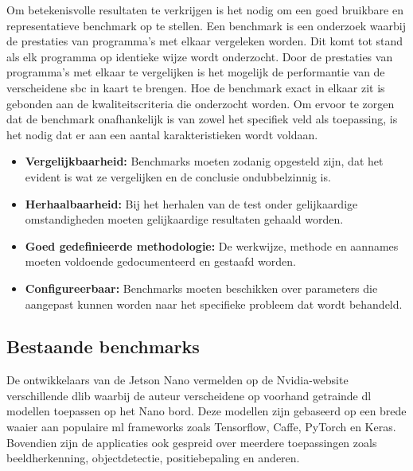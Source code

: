 Om betekenisvolle resultaten te verkrijgen is het nodig om een goed bruikbare en representatieve benchmark op te stellen. Een benchmark is een onderzoek waarbij de prestaties van programma's met elkaar vergeleken worden. Dit komt tot stand als elk programma op identieke wijze wordt onderzocht. Door de prestaties van programma's met elkaar te vergelijken is het mogelijk de performantie van de verscheidene \gls{sbc} in kaart te brengen. Hoe de benchmark exact in elkaar zit is gebonden aan de kwaliteitscriteria die onderzocht worden. Om ervoor te zorgen dat de benchmark onafhankelijk is van zowel het specifiek veld als toepassing, is het nodig dat er aan een aantal karakteristieken wordt voldaan\cite{libuttibenchmarking}.

\begin{itemize}
	\item \textbf{Vergelijkbaarheid:} Benchmarks moeten zodanig opgesteld zijn, dat het evident is wat ze vergelijken en de conclusie ondubbelzinnig is.
	\item \textbf{Herhaalbaarheid:} Bij het herhalen van de test onder gelijkaardige omstandigheden moeten gelijkaardige resultaten gehaald worden.
	\item \textbf{Goed gedefinieerde methodologie:} De werkwijze, methode en aannames moeten voldoende gedocumenteerd en gestaafd worden.
	\item \textbf{Configureerbaar:} Benchmarks moeten beschikken over parameters die aangepast kunnen worden naar het specifieke probleem dat wordt behandeld.
\end{itemize}


	\subsection{Bestaande benchmarks}
	De ontwikkelaars van de Jetson Nano vermelden op de Nvidia-website\cite{bron:nanobenchmark} verschillende \gls{dlib} waarbij de auteur verscheidene op voorhand getrainde \gls{dl} modellen toepassen op het Nano bord. Deze modellen zijn gebaseerd op een brede waaier aan populaire \gls{ml} frameworks zoals Tensorflow, Caffe, PyTorch en Keras. Bovendien zijn de applicaties ook gespreid over meerdere toepassingen zoals beeldherkenning, objectdetectie, positiebepaling en anderen. %


